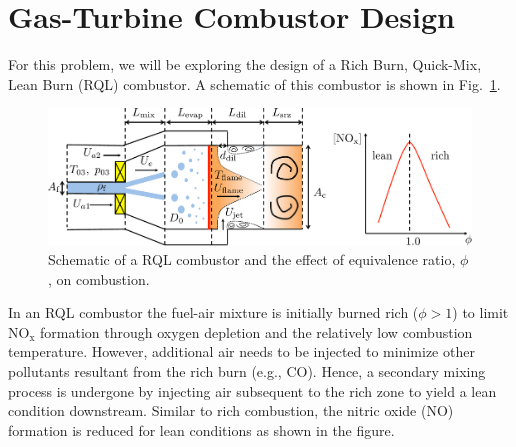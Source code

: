 \documentclass[11pt]{article}
\begin{document}
\section{Gas-Turbine Combustor Design}
For this problem, we will be exploring the design of a Rich Burn, Quick-Mix, Lean Burn (RQL) combustor. A schematic of this combustor is shown in Fig.~\ref{FIG_RQL}. 
\begin{figure}[!bth!]
	\begin{center}
		\includegraphics[width=1.0\textwidth]{RQLCombustor.pdf}
		\caption{\label{FIG_RQL} Schematic of a RQL combustor and the effect of equivalence ratio, $\phi$, on combustion.}
	\end{center}
\end{figure}
In an RQL combustor the fuel-air mixture is initially burned rich ($\phi>1$) to limit NO$_\mathrm{x}$ formation through oxygen depletion and the relatively low combustion temperature. However, additional air needs to be injected to minimize other pollutants resultant from the rich burn (e.g., CO). Hence, a secondary mixing process is undergone by injecting air subsequent to the rich zone to yield a lean condition downstream. Similar to rich combustion, the nitric oxide (NO) formation is reduced for lean conditions as shown in the figure.

\end{document}
